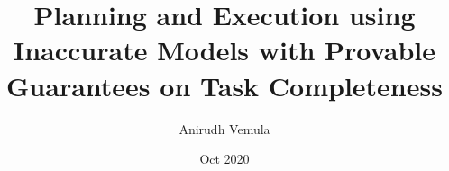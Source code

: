 \documentclass[12pt]{cmuthesis}
\begin{document}
\frontmatter

\pagestyle{empty}

\title{{\bf Planning and Execution using Inaccurate Models with
    Provable Guarantees on Task Completeness}}
\author{Anirudh Vemula}
\date{Oct 2020}


\support{}
\disclaimer{}

\keywords{}

\maketitle

\end{document}
